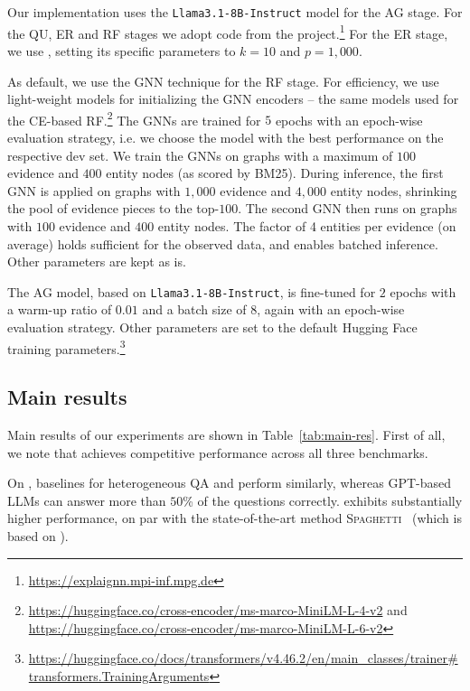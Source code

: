 Our implementation uses the \texttt{Llama3.1-8B-Instruct} model for the AG stage.
For the QU, ER and RF stages
we adopt code from the \explaignn project.\footnote{\url{https://explaignn.mpi-inf.mpg.de}}
For the ER stage, we use \clocq, setting its specific parameters to $k=10$ and $p=1{,}000$.

As default, we use the GNN technique for the RF stage.
For efficiency, we use light-weight models for initializing
the GNN encoders -- the same models used for the CE-based RF.\footnote{\url{https://huggingface.co/cross-encoder/ms-marco-MiniLM-L-4-v2} and\\\url{https://huggingface.co/cross-encoder/ms-marco-MiniLM-L-6-v2}}
The GNNs are trained for $5$ epochs with an epoch-wise evaluation strategy,
i.e. we choose the model with the best performance on the respective dev set.
We train the GNNs on graphs with a maximum of $100$ evidence and $400$ entity nodes (as scored by BM25).
During inference, the first GNN is applied on graphs with $1{,}000$ evidence and $4{,}000$ entity nodes, shrinking the pool of evidence pieces to the top-$100$.
The second GNN then runs on graphs with $100$ evidence and $400$ entity nodes.
The factor of 4 entities per evidence (on average) holds sufficient for the observed data,
and enables batched inference.
Other parameters are kept as is.

The AG model, based on \texttt{Llama3.1-8B-Instruct}, is 
fine-tuned
for $2$ epochs with a warm-up ratio of $0.01$ and a batch size of $8$, again with an epoch-wise evaluation strategy.
Other parameters are set to the default Hugging Face
training parameters.\footnote{\url{https://huggingface.co/docs/transformers/v4.46.2/en/main_classes/trainer\#transformers.TrainingArguments}}





\subsection{Main results}
Main results of our experiments are shown in Table~\ref{tab:main-res}.
First of all, we note that \method achieves competitive performance across all three benchmarks.

On \compmix, baselines for heterogeneous QA and \llama perform similarly,
whereas GPT-based LLMs can answer more than $50$\% of the questions correctly.
\method exhibits substantially higher performance, on par with
the state-of-the-art method \textsc{Spaghetti}~\cite{Zhang-Spaghetti:ACL2024}
(which is based on \gptfour).

